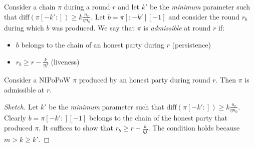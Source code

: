 \begin{definition}
  Consider a chain $\pi$ during a round $r$ and let $k'$
  be the \emph{minimum} parameter such that
  $\text{diff}(\pi[-k':]) \geq k \frac{n_r}{\eta n_0}$.
  Let $b = \pi[:-k'][-1]$ and consider the round $r_b$ during
  which $b$ was produced.
  We say that $\pi$ is \emph{admissible} at round $r$ if:
  \begin{itemize}
    \item $b$ belongs to the chain of an honest party during $r$ (persistence)
    \item $r_b \geq r - \frac{k}{\eta f}$ (liveness)
  \end{itemize}
\end{definition}

\begin{lemma}\label{lem:honest-chop}
  Consider a NIPoPoW $\pi$ produced by an honest party during round $r$.
  Then $\pi$ is admissible at $r$.
\end{lemma}
\begin{proof}[Sketch]
  Let $k'$
  be the \emph{minimum} parameter such that
  $\text{diff}(\pi[-k':]) \geq k \frac{n_r}{\eta n_0}$.
  Clearly $b = \pi[-k':][-1]$ belongs to the chain of the honest party that
  produced $\pi$. It suffices to show that $r_b \geq r - \frac{k}{\eta f}$.
  The condition holds because $m > k \geq k'$.
\end{proof}

